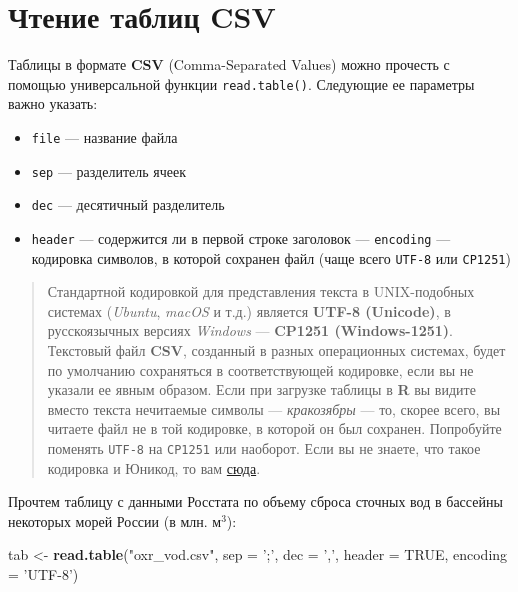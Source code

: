 \documentclass[]{book}
\newenvironment{Shaded}{\begin{snugshade}}{\end{snugshade}}
\newcommand{\KeywordTok}[1]{\textcolor[rgb]{0.13,0.29,0.53}{\textbf{#1}}}
\newcommand{\DataTypeTok}[1]{\textcolor[rgb]{0.13,0.29,0.53}{#1}}
\newcommand{\StringTok}[1]{\textcolor[rgb]{0.31,0.60,0.02}{#1}}
\newcommand{\OtherTok}[1]{\textcolor[rgb]{0.56,0.35,0.01}{#1}}
\newcommand{\NormalTok}[1]{#1}
\providecommand{\tightlist}{%
  \setlength{\itemsep}{0pt}\setlength{\parskip}{0pt}}
\begin{document}
\section{Чтение таблиц CSV}\label{reading_csv}

Таблицы в формате \textbf{CSV} (Comma-Separated Values) можно прочесть с
помощью универсальной функции \texttt{read.table()}. Следующие ее
параметры важно указать:

\begin{itemize}
\tightlist
\item
  \texttt{file} --- название файла
\item
  \texttt{sep} --- разделитель ячеек
\item
  \texttt{dec} --- десятичный разделитель
\item
  \texttt{header} --- содержится ли в первой строке заголовок ---
  \texttt{encoding} --- кодировка символов, в которой сохранен файл
  (чаще всего \texttt{UTF-8} или \texttt{CP1251})
\end{itemize}

\begin{quote}
Стандартной кодировкой для представления текста в UNIX-подобных системах
(\emph{Ubuntu}, \emph{macOS} и т.д.) является \textbf{UTF-8 (Unicode)},
в русскоязычных версиях \emph{Windows} --- \textbf{CP1251
(Windows-1251)}. Текстовый файл \textbf{CSV}, созданный в разных
операционных системах, будет по умолчанию сохраняться в соответствующей
кодировке, если вы не указали ее явным образом. Если при загрузке
таблицы в \textbf{R} вы видите вместо текста нечитаемые символы ---
\emph{кракозябры} --- то, скорее всего, вы читаете файл не в той
кодировке, в которой он был сохранен. Попробуйте поменять \texttt{UTF-8}
на \texttt{CP1251} или наоборот. Если вы не знаете, что такое кодировка
и Юникод, то вам
\href{https://ru.wikipedia.org/wiki/Набор_символов}{сюда}.
\end{quote}

Прочтем таблицу с данными Росстата по объему сброса сточных вод в
бассейны некоторых морей России (в млн. м\(^3\)):

\begin{Shaded}
\begin{Highlighting}[]
\NormalTok{tab <-}\StringTok{ }\KeywordTok{read.table}\NormalTok{(}\StringTok{"oxr_vod.csv"}\NormalTok{,}
                  \DataTypeTok{sep =} \StringTok{';'}\NormalTok{,}
                  \DataTypeTok{dec =} \StringTok{','}\NormalTok{,}
                  \DataTypeTok{header =} \OtherTok{TRUE}\NormalTok{,}
                  \DataTypeTok{encoding =} \StringTok{'UTF-8'}\NormalTok{)}
\end{Highlighting}
\end{Shaded}
\end{document}
